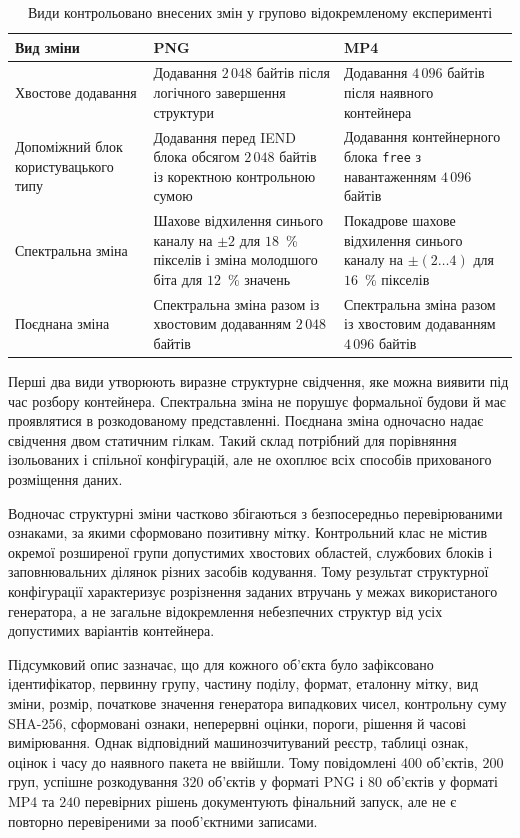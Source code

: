\begin{table}[htbp]
\caption{Види контрольовано внесених змін у групово відокремленому експерименті}
\label{tab:ch4_ind_svs_changes}
\centering
\scriptsize
\begin{tabularx}{\textwidth}{p{}Y Y}
\toprule
Вид зміни & PNG & MP4 \\
\midrule
Хвостове додавання & Додавання $2\,048$ байтів після логічного завершення структури & Додавання $4\,096$ байтів після наявного контейнера \\
Допоміжний блок користувацького типу & Додавання перед IEND блока обсягом $2\,048$ байтів із коректною контрольною сумою & Додавання контейнерного блока \texttt{free} з навантаженням $4\,096$ байтів \\
Спектральна зміна & Шахове відхилення синього каналу на $\pm2$ для $18$~\% пікселів і зміна молодшого біта для $12$~\% значень & Покадрове шахове відхилення синього каналу на $\pm(2\ldots4)$ для $16$~\% пікселів \\
Поєднана зміна & Спектральна зміна разом із хвостовим додаванням $2\,048$ байтів & Спектральна зміна разом із хвостовим додаванням $4\,096$ байтів \\
\bottomrule
\end{tabularx}
\end{table}

Перші два види утворюють виразне структурне свідчення, яке можна виявити під час розбору контейнера. Спектральна зміна не порушує формальної будови й має проявлятися в розкодованому представленні. Поєднана зміна одночасно надає свідчення двом статичним гілкам. Такий склад потрібний для порівняння ізольованих і спільної конфігурацій, але не охоплює всіх способів прихованого розміщення даних.

Водночас структурні зміни частково збігаються з безпосередньо перевірюваними ознаками, за якими сформовано позитивну мітку. Контрольний клас не містив окремої розширеної групи допустимих хвостових областей, службових блоків і заповнювальних ділянок різних засобів кодування. Тому результат структурної конфігурації характеризує розрізнення заданих втручань у межах використаного генератора, а не загальне відокремлення небезпечних структур від усіх допустимих варіантів контейнера.

Підсумковий опис зазначає, що для кожного об’єкта було зафіксовано ідентифікатор, первинну групу, частину поділу, формат, еталонну мітку, вид зміни, розмір, початкове значення генератора випадкових чисел, контрольну суму SHA-256, сформовані ознаки, неперервні оцінки, пороги, рішення й часові вимірювання. Однак відповідний машинозчитуваний реєстр, таблиці ознак, оцінок і часу до наявного пакета не ввійшли. Тому повідомлені $400$ об’єктів, $200$ груп, успішне розкодування $320$ об’єктів у форматі PNG і $80$ об’єктів у форматі MP4 та $240$ перевірних рішень документують фінальний запуск, але не є повторно перевіреними за пооб’єктними записами.

